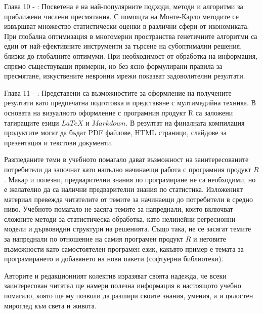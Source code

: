 Глава 10 - : Посветена е на най-популярните подходи, методи и алгоритми за приближени числени пресмятания. С помощта на Монте-Карло методите се извършват множество статистически оценки в различни сфери от икономиката. При глобална оптимизация в многомерни пространства генетичните алгоритми са един от най-ефективните инструменти за търсене на субоптимални решения, близки до глобалните оптимуми. При необходимост от обработка на информация, спрямо съществуващи примерни, но без ясно формулирани правила за пресмятане, изкуствените невронни  мрежи показват задоволителни резултати. 

Глава 11 - : Представени са възможностите за оформление на получените резултати като предпечатна подготовка и представяне с мултимедийна техника. В основата на визуалното оформление с програмния продукт R са заложени тагиращите езици $LaTeX$ и $Markdown$. В резултат на финалната компилация продуктите могат да бъдат PDF файлове, HTML страници, слайдове за презентация и текстови документи. 

Разгледаните теми в учебното помагало дават възможност на заинтересованите потребители да започнат като напълно начинаещи работа с програмния продукт $R$. Макар и полезни, предварителни знания по програмиране не са необходими, но е желателно да са налични предварителни знания по статистика. Изложеният материал превежда читателите от темите за начинаещи до потребители в средно ниво. Учебното помагало не засяга темите за напреднали, които включват сложните методи за статистическа обработка, като нелинейни регресионни модели и дървовидни структури на решенията. Също така, не се засягат темите за напреднали по отношение на самия програмен продукт $R$ и неговите възможности като самостоятелен програмен език, какъвто пример е темата за програмирането и добавянето на нови пакети (софтуерни библиотеки). 

Авторите и редакционният колектив изразяват своята надежда, че всеки заинтересован читател ще намери полезна информация в настоящото учебно помагало, която ще му позволи да разшири своите знания, умения, а и цялостен мироглед към света и живота. 

